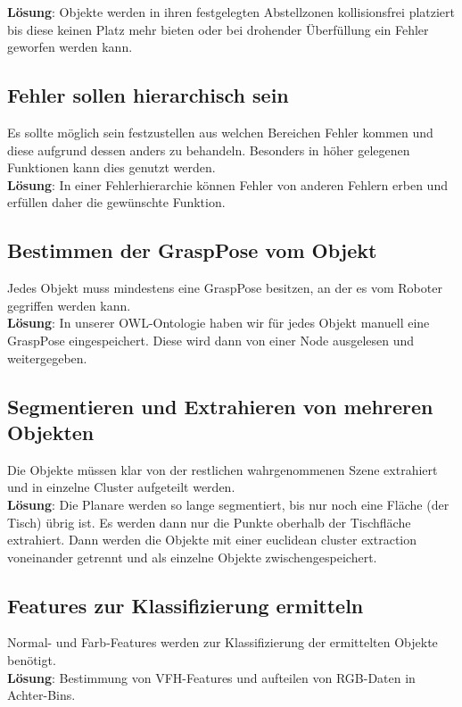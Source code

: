 \documentclass{suturo}
\begin{document}
\textbf{Lösung}: Objekte werden in ihren festgelegten Abstellzonen kollisionsfrei platziert bis diese keinen Platz mehr bieten oder bei drohender Überfüllung ein Fehler geworfen werden kann. 


\subsection{Fehler sollen hierarchisch sein}
Es sollte möglich sein festzustellen aus welchen Bereichen Fehler kommen und diese aufgrund dessen anders zu behandeln. Besonders in höher gelegenen Funktionen kann dies genutzt werden. \\

\textbf{Lösung}: In einer Fehlerhierarchie können Fehler von anderen Fehlern erben und erfüllen daher die gewünschte Funktion.

\subsection{Bestimmen der GraspPose vom Objekt}
Jedes Objekt muss mindestens eine GraspPose besitzen, an der es vom Roboter gegriffen werden kann.\\

\textbf{Lösung}: In unserer OWL-Ontologie haben wir für jedes Objekt manuell eine GraspPose eingespeichert. Diese wird dann von einer Node ausgelesen und weitergegeben.

\subsection{Segmentieren und Extrahieren von mehreren Objekten}
Die Objekte müssen klar von der restlichen wahrgenommenen Szene extrahiert und in einzelne Cluster aufgeteilt werden.\\
\textbf{Lösung}: Die Planare werden so lange segmentiert, bis nur noch eine Fläche (der Tisch) übrig ist. Es werden dann nur die Punkte oberhalb der Tischfläche extrahiert. Dann werden die Objekte mit einer euclidean cluster extraction voneinander getrennt und als einzelne Objekte zwischengespeichert.

\subsection{Features zur Klassifizierung ermitteln}
Normal- und Farb-Features werden zur Klassifizierung der ermittelten Objekte benötigt. \\
\textbf{Lösung}: Bestimmung von VFH-Features und aufteilen von RGB-Daten in Achter-Bins.
\end{document}
